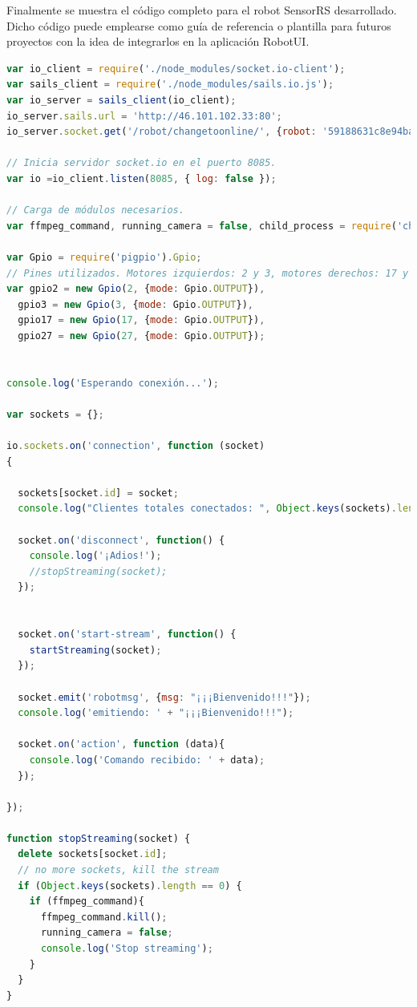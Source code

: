 Finalmente se muestra el código completo para el robot SensorRS desarrollado. Dicho código puede emplearse como guía de referencia o plantilla para futuros proyectos con la idea de integrarlos en la aplicación RobotUI.\\


\begin{lstlisting}[language=JavaScript]
var io_client = require('./node_modules/socket.io-client');
var sails_client = require('./node_modules/sails.io.js');
var io_server = sails_client(io_client);
io_server.sails.url = 'http://46.101.102.33:80';
io_server.socket.get('/robot/changetoonline/', {robot: '59188631c8e94ba54f7a4bdc', online: true});

// Inicia servidor socket.io en el puerto 8085.
var io =io_client.listen(8085, { log: false });

// Carga de módulos necesarios.
var ffmpeg_command, running_camera = false, child_process = require('child_process');

var Gpio = require('pigpio').Gpio;
// Pines utilizados. Motores izquierdos: 2 y 3, motores derechos: 17 y 27
var gpio2 = new Gpio(2, {mode: Gpio.OUTPUT}),
  gpio3 = new Gpio(3, {mode: Gpio.OUTPUT}),
  gpio17 = new Gpio(17, {mode: Gpio.OUTPUT}),
  gpio27 = new Gpio(27, {mode: Gpio.OUTPUT});


console.log('Esperando conexión...');

var sockets = {};

io.sockets.on('connection', function (socket)
{

  sockets[socket.id] = socket;
  console.log("Clientes totales conectados: ", Object.keys(sockets).length);

  socket.on('disconnect', function() {
    console.log('¡Adios!');
    //stopStreaming(socket);
  });


  socket.on('start-stream', function() {
    startStreaming(socket);
  });

  socket.emit('robotmsg', {msg: "¡¡¡Bienvenido!!!"});
  console.log('emitiendo: ' + "¡¡¡Bienvenido!!!");

  socket.on('action', function (data){
    console.log('Comando recibido: ' + data);
  });
  
});

function stopStreaming(socket) {
  delete sockets[socket.id];
  // no more sockets, kill the stream
  if (Object.keys(sockets).length == 0) {
    if (ffmpeg_command){
      ffmpeg_command.kill();
      running_camera = false;
      console.log('Stop streaming');
    }
  }
}


\end{lstlisting}
